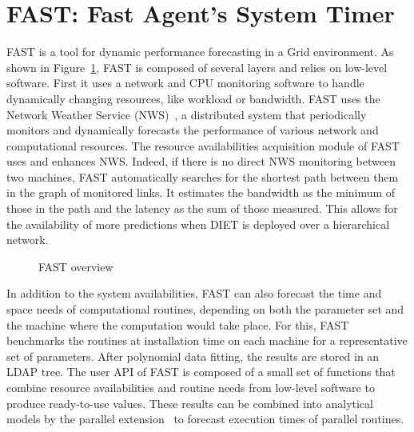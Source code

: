 

\section{FAST: Fast Agent's System Timer}
\label{sec:FAST}

FAST \cite{Qui02} is a tool for dynamic performance forecasting in a
Grid environment. As shown in Figure~\ref{fig:fast-overview}, FAST is
composed of several layers and relies on low-level software. First it
uses a network and CPU monitoring software to handle dynamically
changing resources, like workload or bandwidth.  FAST uses the Network
Weather Service (NWS)~\cite{WSH99}, a distributed system that
periodically monitors and dynamically forecasts the performance of
various network and computational resources. The resource
availabilities acquisition module of FAST uses and enhances NWS.
Indeed, if there is no direct NWS monitoring between two machines,
FAST automatically searches for the shortest path between them in the
graph of monitored links. It estimates the bandwidth as the minimum of
those in the path and the latency as the sum of those measured. This
allows for the availability of more predictions when DIET is deployed
over a hierarchical network.

\begin{figure}[htb]
  \begin{center}
    \caption{FAST overview}
    \label{fig:fast-overview}
  \end{center}
\end{figure}

In addition to the system availabilities, FAST can also forecast the
time and space needs of computational routines, depending on both the
parameter set and the machine where the computation would take place.
For this, FAST benchmarks the routines at installation time on each
machine for a representative set of parameters. After polynomial data
fitting, the results are stored in an LDAP tree.  The user API of FAST
is composed of a small set of functions that combine resource
availabilities and routine needs from low-level software to produce
ready-to-use values.  These results can be combined into analytical
models by the parallel extension~\cite{CS02} to forecast execution
times of parallel routines.

